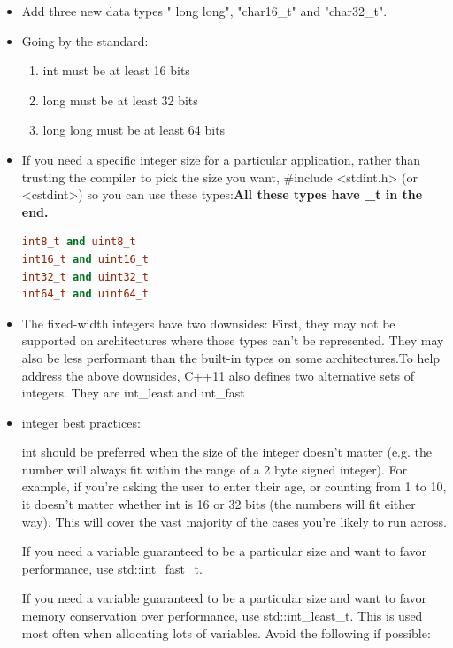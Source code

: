 \documentclass[a4paper,12pt,twoside]{book}
\begin{document}
\begin{itemize}
\item Add three new data types " long long", "char16\_t"  and "char32\_t".

\item Going by the standard:
\begin{enumerate}
\item int must be at least 16 bits
\item long must be at least 32 bits
\item long long must be at least 64 bits
\end{enumerate}

\item If you need a specific integer size for a particular application, rather than trusting the compiler to pick the size you want, \#include <stdint.h> (or <cstdint>) so you can use these types:\textbf{All these types have \_t in the end.}
\begin{lstlisting}[frame=single, language=c++]
int8_t and uint8_t
int16_t and uint16_t
int32_t and uint32_t
int64_t and uint64_t
\end{lstlisting}

\item The fixed-width integers have two downsides: First, they may not be supported on architectures where those types can’t be represented. They may also be less performant than the built-in types on some architectures.To help address the above downsides, C++11 also defines two alternative sets of integers. They are int\_least and int\_fast 



\item integer best practices:


int should be preferred when the size of the integer doesn’t matter (e.g. the number will always fit within the range of a 2 byte signed integer). For example, if you’re asking the user to enter their age, or counting from 1 to 10, it doesn’t matter whether int is 16 or 32 bits (the numbers will fit either way). This will cover the vast majority of the cases you’re likely to run across.

If you need a variable guaranteed to be a particular size and want to favor performance, use std::int\_fast\_t.

If you need a variable guaranteed to be a particular size and want to favor memory conservation over performance, use std::int\_least\_t. This is used most often when allocating lots of variables.
Avoid the following if possible:


\end{itemize}
\end{document}
